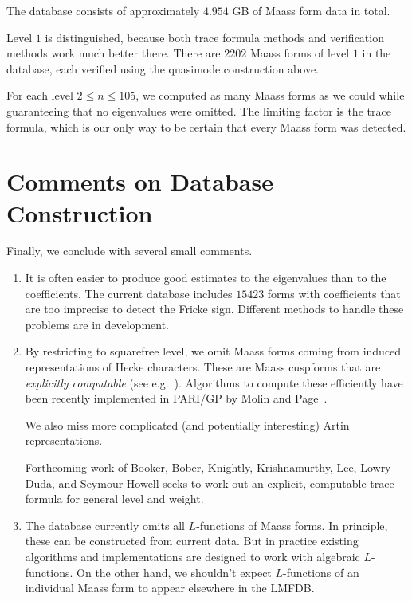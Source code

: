 \documentclass[11pt,reqno,oneside]{amsart}
\theoremstyle{plain}
\theoremstyle{definition}
\begin{document}
The database consists of approximately $4.954$ GB of Maass form data in total.

Level $1$ is distinguished, because both trace formula methods and verification
methods work much better there.
There are $2202$ Maass forms of level $1$ in the database, each verified using
the quasimode construction above.

For each level $2 \leq n \leq 105$, we computed as many Maass forms as we could
while guaranteeing that no eigenvalues were omitted.
The limiting factor is the trace formula, which is our only way to be certain
that every Maass form was detected.



\section{Comments on Database Construction}\label{sec:comments}

Finally, we conclude with several small comments.

\begin{enumerate}
  \item
  It is often easier to produce good estimates to the eigenvalues than to
  the coefficients.
  The current database includes $15423$ forms with coefficients that are too
  imprecise to detect the Fricke sign.
  Different methods to handle these problems are in development.

  \item
  By restricting to squarefree level, we omit Maass forms coming from induced
  representations of Hecke characters.
  These are Maass cuspforms that are \emph{explicitly computable} (see
  e.g.~\cite{maass1949automorphe}).
  Algorithms to compute these efficiently have been recently implemented in
  PARI/GP by Molin and Page~\cite{molin2022computing}.

  We also miss more complicated (and potentially interesting) Artin
  representations.

  Forthcoming work of Booker, Bober, Knightly, Krishnamurthy, Lee, Lowry-Duda,
  and Seymour-Howell seeks to work out an explicit, computable trace formula
  for general level and weight.

  \item
  The database currently omits all $L$-functions of Maass forms.
  In principle, these can be constructed from current data.
  But in practice existing algorithms and implementations are designed to work
  with algebraic $L$-functions.
  On the other hand, we shouldn't expect $L$-functions of an individual Maass
  form to appear elsewhere in the LMFDB.\@
\end{enumerate}
\end{document}
